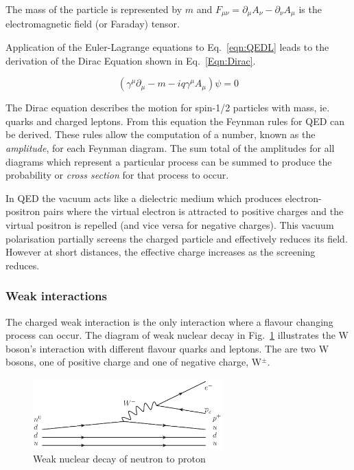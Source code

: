 The mass of the particle is represented by $m$ and $F_{\mu\nu} = \partial_{\mu}A_{\nu} - \partial_{\nu}A_{\mu}$ is the electromagnetic field (or Faraday) tensor.

Application of the Euler-Lagrange equations to Eq.~\ref{eqn:QEDL} leads to the derivation of the Dirac Equation shown in Eq.~\ref{Eqn:Dirac}.

\begin{equation}
\left( \gamma^{\mu }\partial _{\mu } -m - iq\gamma^{\mu }A_{\mu}\right)\psi = 0
\label{Eqn:Dirac}
\end{equation}

The Dirac equation describes the motion for spin-1/2 particles with mass, ie. quarks and charged leptons. From this equation the Feynman rules for QED can be derived. These rules allow the computation of a number, known as the \emph{amplitude}, for each Feynman diagram. The sum total of the amplitudes for all diagrams which represent a particular process can be summed to produce the probability or \emph{cross section} for that process to occur.

In QED the vacuum acts like a dielectric medium which produces electron-positron pairs where the virtual electron is attracted to positive charges and the virtual positron is repelled (and vice versa for negative charges). This vacuum polarisation partially screens the charged particle and effectively reduces its field. However at short distances, the effective charge increases as the screening reduces.

\subsubsection{Weak interactions}

The charged weak interaction is the only interaction where a flavour changing process can occur. The diagram of weak nuclear decay in Fig.~\ref{fig:QEDvertex} illustrates the W boson's interaction with different flavour quarks and leptons. The are two W bosons, one of positive charge and one of negative charge, W$^{\pm}$.


\begin{figure}[ht!]
\begin{center}
    \includegraphics[width=0.65\textwidth]{images/Theory/weakDecay.png}
    \caption{Weak nuclear decay of neutron to proton}
    \label{fig:QEDvertex}
\end{center}
\end{figure}

